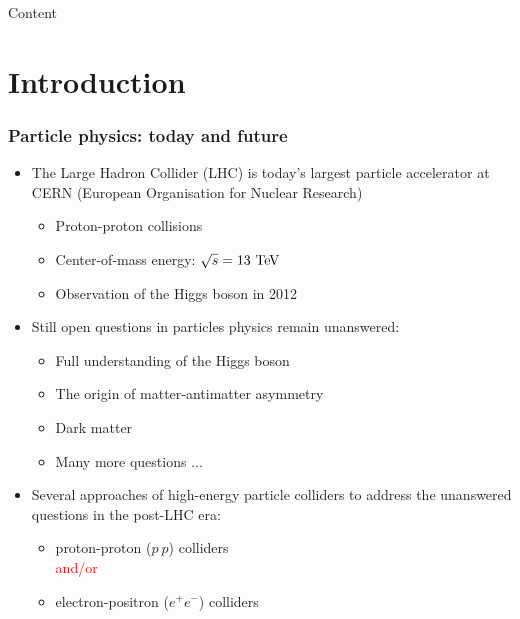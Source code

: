 
\begin{frame}{Content}{}
\tableofcontents
\end{frame}

\section{Introduction}
\begin{frame}
  \frametitle{Particle physics: today and future}

  \begin{itemize}
  \item The Large Hadron Collider (LHC) is today's largest particle
    accelerator at CERN (European Organisation for Nuclear Research)
    \begin{itemize}
    \item Proton-proton collisions
    \item Center-of-mass energy: $\sqrt{s}=13\,\mathrm{\,Te\kern -0.1em V}$
    \item Observation of the Higgs boson in 2012
    \end{itemize}

  \item Still open questions in particles physics remain unanswered:
    \begin{itemize}
    \item Full understanding of the Higgs boson
    \item The origin of matter-antimatter asymmetry
    \item Dark matter
    \item Many more questions ...
    \end{itemize}

  \item Several approaches of high-energy particle colliders to
    address the unanswered questions in the post-LHC era:
    \begin{itemize}
    \item proton-proton ($p~p$) colliders
      \\
      \textcolor{Red}{and/or}
      \\
    \item electron-positron ($e^+e^-$) colliders
    \end{itemize}
  \end{itemize}

\end{frame}

